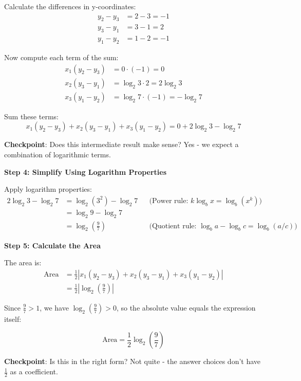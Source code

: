 \documentclass[12pt]{article}
\begin{document}
\begin{solutionbox}
Calculate the differences in y-coordinates:
\begin{align*}
    y_2 - y_3 &= 2 - 3 = -1 \\
    y_3 - y_1 &= 3 - 1 = 2 \\
    y_1 - y_2 &= 1 - 2 = -1
\end{align*}

Now compute each term of the sum:
\begin{align*}
    x_1(y_2 - y_3) &= 0 \cdot (-1) = 0 \\
    x_2(y_3 - y_1) &= \log_2 3 \cdot 2 = 2\log_2 3 \\
    x_3(y_1 - y_2) &= \log_2 7 \cdot (-1) = -\log_2 7
\end{align*}

Sum these terms:
$$x_1(y_2 - y_3) + x_2(y_3 - y_1) + x_3(y_1 - y_2) = 0 + 2\log_2 3 - \log_2 7$$

\textbf{Checkpoint}: Does this intermediate result make sense? Yes - we expect a combination of logarithmic terms.

\vspace{0.3cm}

\textbf{Step 4: Simplify Using Logarithm Properties}

Apply logarithm properties:
\begin{align*}
    2\log_2 3 - \log_2 7 &= \log_2(3^2) - \log_2 7 && \text{(Power rule: } k\log_b x = \log_b(x^k)\text{)} \\
    &= \log_2 9 - \log_2 7 \\
    &= \log_2\left(\frac{9}{7}\right) && \text{(Quotient rule: } \log_b a - \log_b c = \log_b(a/c)\text{)}
\end{align*}

\vspace{0.3cm}

\textbf{Step 5: Calculate the Area}

The area is:
\begin{align*}
    \text{Area} &= \frac{1}{2}\left|x_1(y_2-y_3) + x_2(y_3-y_1) + x_3(y_1-y_2)\right| \\
    &= \frac{1}{2}\left|\log_2\left(\frac{9}{7}\right)\right|
\end{align*}

Since $\frac{9}{7} > 1$, we have $\log_2\left(\frac{9}{7}\right) > 0$, so the absolute value equals the expression itself:

$$\text{Area} = \frac{1}{2}\log_2\left(\frac{9}{7}\right)$$

\textbf{Checkpoint}: Is this in the right form? Not quite - the answer choices don't have $\frac{1}{2}$ as a coefficient.


\end{solutionbox}
\end{document}
